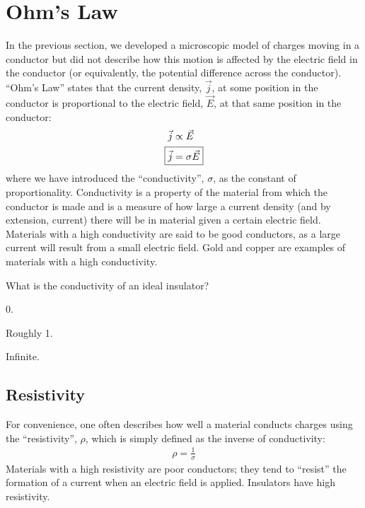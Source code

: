 \section{Ohm's Law}
In the previous section, we developed a microscopic model of charges moving in a conductor but did not describe how this motion is affected by the electric field in the conductor (or equivalently, the potential difference across the conductor). ``Ohm's Law'' states that the current density, $\vec j$, at some position in the conductor is proportional to the electric field, $\vec E$, at that same position in the conductor:
\begin{align*}
\vec j &\propto \vec E\\
\Aboxed{\vec j &= \sigma \vec E}
\end{align*}
where we have introduced the ``conductivity'', $\sigma$, as the constant of proportionality. Conductivity is a property of the material from which the conductor is made and is a measure of how large a current density (and by extension, current) there will be in material given a certain electric field. Materials with a high conductivity are said to be good conductors, as a large current will result from a small electric field. Gold and copper are examples of materials with a high conductivity.

\begin{checkpoint}
	\begin{MCquestion}{What is the conductivity of an ideal insulator?}
		\item 0. \correct
		\item Roughly 1.
		\item Infinite.
	\end{MCquestion}
\end{checkpoint}

\subsection{Resistivity}
For convenience, one often describes how well a material conducts charges using the ``resistivity'', $\rho$, which is simply defined as the inverse of conductivity:
\begin{align*}
\rho = \frac{1}{\sigma}
\end{align*}
Materials with a high resistivity are poor conductors; they tend to ``resist'' the formation of a current when an electric field is applied. Insulators have high resistivity.

